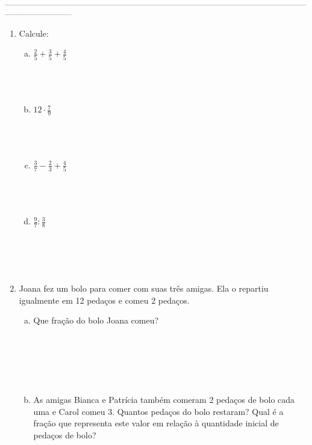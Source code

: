 \documentclass[a4paper,14pt]{article}
\begin{document}
		\noindent\textsubscript{--------------------------------------------------------------------------------------------------------------------------------------------------------------}
	\begin{multicols}{2}
		\begin{enumerate} 
			\item Calcule:
			\begin{enumerate}[a)]
				\item $\frac{2}{5} + \frac{3}{5} + \frac{4}{5}$ \\\\\\\\
				\item $12 \cdot \frac{7}{9}$ \\\\\\\\
				\item $\frac{3}{7} - \frac{2}{3} + \frac{4}{5}$ \\\\\\\\
				\item $\frac{9}{7} : \frac{3}{8}$ \\\\\\\\\\
			\end{enumerate}
			\item Joana fez um bolo para comer com suas três amigas. Ela o repartiu igualmente em 12 pedaços e comeu 2 pedaços.
			\begin{enumerate}[a)]
				\item Que fração do bolo Joana comeu? \\\\\\\\\\\\
				\item As amigas Bianca e Patrícia também comeram 2 pedaços de bolo cada uma e Carol comeu 3. Quantos pedaços do bolo restaram? Qual é a fração que representa este valor em relação à quantidade inicial de pedaços de bolo?  \\\\\\\\\\\\

\end{enumerate}
\end{enumerate}
\end{multicols}
\end{document}
